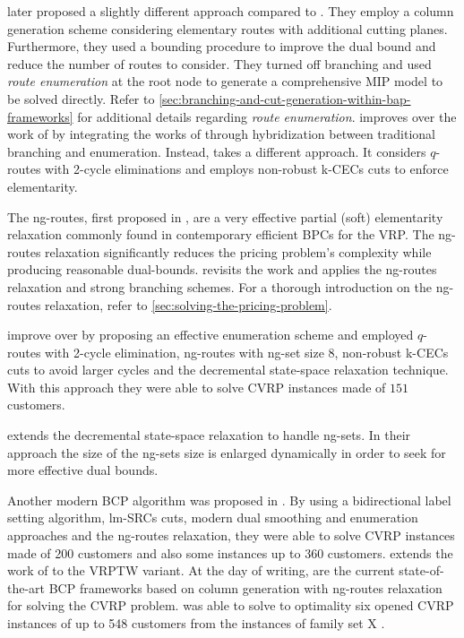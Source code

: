 \Textcite{baldacci2008} later proposed a slightly different approach compared to \textcite{fukasawa2006}.
They employ a column generation scheme considering elementary routes
with additional cutting planes.
Furthermore, they used a bounding procedure to improve the dual bound
and reduce the number of routes to consider.
They turned off branching and used \textit{route enumeration}
at the root node to generate a comprehensive MIP model to be solved directly.
Refer to \cref{sec:branching-and-cut-generation-within-bap-frameworks} for additional details
regarding \textit{route enumeration}.
\textcite{pessoa2008} improves over the work of \textcite{fukasawa2006}
by integrating the works of \textcite{fukasawa2006, baldacci2008}
through hybridization between traditional branching and enumeration.
Instead, \textcite{contardo2011} takes a different approach.
It considers $q$-routes with 2-cycle eliminations and employs non-robust k-CECs cuts
to enforce elementarity.

The ng-routes,
first proposed in \textcite{baldacci2011},
are a very effective partial (soft) elementarity relaxation commonly found
in contemporary efficient BPCs for the VRP.
The ng-routes relaxation significantly reduces the pricing problem's complexity
while producing reasonable dual-bounds.
\textcite{ropke2012} revisits the work \citeauthor{fukasawa2006}
and applies the ng-routes relaxation and strong branching schemes.
For a thorough introduction on the ng-routes relaxation, refer to \cref{sec:solving-the-pricing-problem}.


\textcite{contardo2014} improve over \textcite{contardo2011}
by proposing an effective enumeration scheme and employed
$q$-routes with 2-cycle elimination, ng-routes with ng-set size 8,
non-robust k-CECs cuts to avoid larger cycles
and the decremental state-space relaxation technique.
With this approach they were able to solve CVRP instances made of $151$ customers.

\textcite{martinelli2014} extends the decremental state-space relaxation
to handle ng-sets.
In their approach the size of the ng-sets size
is enlarged dynamically in order to seek for more effective dual bounds.

Another modern BCP algorithm was proposed in \textcite{pecin2017improved}.
By using a bidirectional label setting algorithm,
lm-SRCs cuts, modern dual smoothing and enumeration approaches
and the ng-routes relaxation, they were able to solve CVRP instances made of 200 customers
and also some instances up to 360 customers.
\textcite{pecin2017new} extends the work of \textcite{pecin2017improved} to the VRPTW variant.
At the day of writing, \textcite{pessoa2018enhanced, pessoa2020generic} are the current state-of-the-art
BCP frameworks based on column generation with ng-routes relaxation
for solving the CVRP problem.
\textcite{pessoa2020generic} was able to solve to optimality six opened
CVRP instances of up to 548 customers from the instances of family set X \parencite{uchoa2017}.

